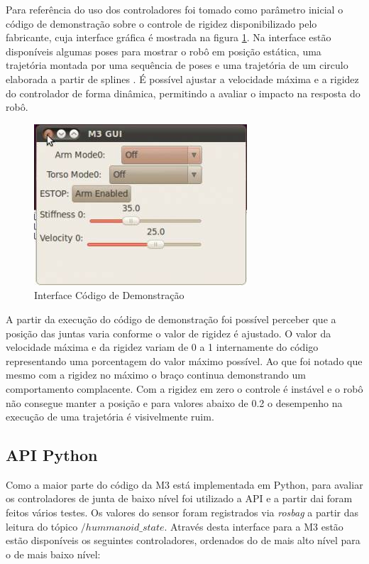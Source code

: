 Para referência do uso dos controladores foi tomado como parâmetro inicial o código de demonstração sobre o controle de rigidez disponibilizado pelo fabricante, cuja interface gráfica é mostrada na figura \ref{fig:m3demo}. Na interface estão disponíveis algumas poses para mostrar o robô em posição estática, uma trajetória montada por uma sequência de poses e uma trajetória de um circulo elaborada a partir de splines \cite{nobody}. É possível ajustar a velocidade máxima e a rigidez do controlador de forma dinâmica, permitindo a avaliar o impacto na resposta do robô.

\begin{figure}[H]
    \centering
    \includegraphics[width=0.5\linewidth]{tex/figs/mekademo.png}
    \caption{Interface Código de Demonstração \cite{mekaguide}}
    \label{fig:m3demo}
\end{figure}

A partir da execução do código de demonstração foi possível perceber que a posição das juntas varia conforme o valor de rigidez é ajustado. O valor da velocidade máxima e da rigidez variam de 0 a 1 internamente do código representando uma porcentagem do valor máximo possível. Ao que foi notado que mesmo com a rigidez no máximo o braço continua demonstrando um comportamento complacente. Com a rigidez em zero o controle é instável e o robô não consegue manter a posição e para valores abaixo de 0.2 o desempenho na execução de uma trajetória é visivelmente ruim.


\subsection{API Python}

Como a maior parte do código da M3 está implementada em Python, para avaliar os controladores de junta de baixo nível foi utilizado a API e a partir dai foram feitos vários testes. Os valores do sensor foram registrados via \textit{rosbag} a partir das leitura do tópico $/hummanoid\_state$. Através desta interface para a M3 estão estão disponíveis os seguintes controladores, ordenados do de mais alto nível para o de mais baixo nível:

